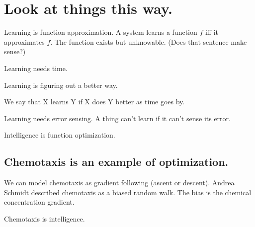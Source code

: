 \chapter{Look at things this way.}

Learning is function approximation.
A system learns a function \(f\) iff it approximates \(f\).
The function exists but unknowable. (Does that sentence make sense?)

Learning needs time.

Learning is figuring out a better way.

We say that X learns Y if X does Y better as time goes by.

Learning needs error sensing.
A thing can't learn if it can't sense its error.

Intelligence is function optimization.

\section{Chemotaxis is an example of optimization.}

We can model chemotaxis as gradient following (ascent or descent).
Andrea Schmidt described chemotaxis as a biased random walk.
The bias is the chemical concentration gradient.

Chemotaxis is intelligence.
